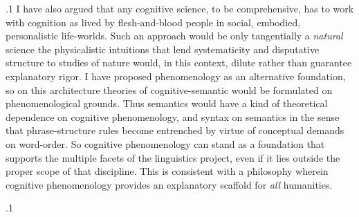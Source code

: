 \documentclass[11pt, twocolumn]{article}
\begin{document}
\p.1{%
I have also argued that any cognitive
science, to be comprehensive, has to work
with cognition as lived by flesh-and-blood
people in social, embodied, personalistic life-worlds.
Such an approach would be only tangentially a
\textit{natural} science \mdash{} the physicalistic
intuitions that lend systematicity and
disputative structure to studies of nature
would, in this context, dilute rather than
guarantee explanatory rigor.  I have proposed
phenomenology as an alternative foundation,
so \mdash{} on this architecture \mdash{} theories
of cognitive-semantic 
would be formulated on phenomenological
grounds.  Thus semantics would have a
kind of theoretical dependence
on cognitive phenomenology, and
syntax on semantics in the sense
that phrase-structure rules become entrenched
by virtue of conceptual demands on word-order.  So cognitive
phenomenology can stand as a foundation
that supports the multiple facets of the
linguistics project, even if it
lies outside the proper scope of that
discipline.  This is consistent with a
philosophy wherein cognitive
phenomenology provides an explanatory
scaffold for \textit{all} humanities.
} %

\p.1{%

} %
\end{document}

